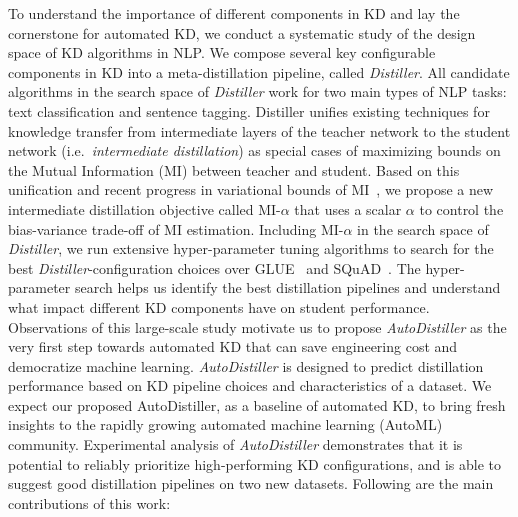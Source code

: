 \documentclass[11pt]{article}
\begin{document}
To understand the importance of different components in KD and lay the cornerstone for automated KD, we conduct a systematic study of the design space of KD algorithms in NLP. We compose several key configurable components in KD into a meta-distillation pipeline, called \emph{Distiller}. All candidate algorithms in the search space of \emph{Distiller} work for two main types of NLP tasks: text classification and sentence tagging.
Distiller unifies existing techniques for knowledge transfer from intermediate layers of the teacher network to the student network (i.e.\ \emph{intermediate distillation}) as special cases of maximizing bounds on the Mutual Information (MI) between teacher and student.
Based on this unification and recent progress in variational bounds of MI~\citep{poole2019variational}, we propose a new intermediate distillation objective called MI-$\alpha$ that uses a scalar $\alpha$ to control the bias-variance trade-off of MI estimation. Including MI-$\alpha$ in the search space of \emph{Distiller}, we run extensive hyper-parameter tuning algorithms to search for the best \emph{Distiller}-configuration choices over GLUE~\citep{wang2018glue} and SQuAD~\citep{rajpurkar2016squad}. 
The hyper-parameter search helps us identify the best distillation pipelines and understand what impact different KD components have on student performance. 
Observations of this large-scale study motivate us to propose \emph{AutoDistiller} as the very first step towards automated KD that can save engineering cost and democratize machine learning. \emph{AutoDistiller} is designed to predict distillation performance based on KD pipeline choices and characteristics of a dataset. We expect our proposed AutoDistiller, as a baseline of automated KD, to bring fresh insights to the rapidly growing automated machine learning (AutoML) community. Experimental analysis of \emph{AutoDistiller} demonstrates that it is potential to reliably prioritize high-performing KD configurations, and is able to suggest good distillation pipelines on two new datasets. Following are the main contributions of this work:
\end{document}

